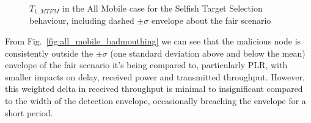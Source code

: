 \documentclass[conference]{IEEEtran}
\begin{document}
\begin{figure}[h]
  \newline
\caption{$T_{1,MTFM}$ in the All Mobile case for the Selfish Target Selection behaviour, including dashed $\pm\sigma$ envelope about the fair scenario}
\label{fig:all_mobile_selfish}
\end{figure}

From Fig.~\ref{fig:all_mobile_badmouthing} we can see that the malicious node is consistently outside the $\pm\sigma$ (one standard deviation above and below the mean) envelope of the fair scenario it's being compared to, particularly PLR, with smaller impacts on delay, received power and transmitted throughput. 
However, this weighted delta in received throughput is minimal to insignificant compared to the width of the detection envelope, occasionally breaching the envelope for a short period. 
\end{document}
